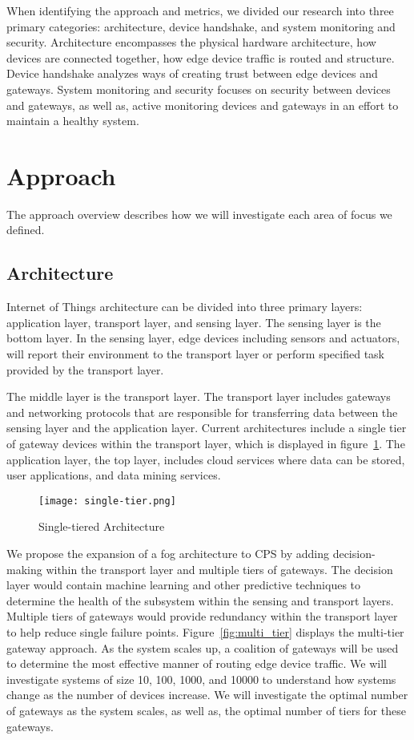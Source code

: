 \documentclass[../main.tex]{subfiles}
\begin{document}
When identifying the approach and metrics, we divided our research into three primary categories: architecture, device handshake, and system monitoring and security. Architecture encompasses the physical hardware architecture, how devices are connected together, how edge device traffic is routed and structure. Device handshake analyzes ways of creating trust between edge devices and gateways. System monitoring and security focuses on security between devices and gateways, as well as, active monitoring devices and gateways in an effort to maintain a healthy system. 


\section{Approach}

The approach overview describes how we will investigate each area of focus we defined. 

\subsection{Architecture}
Internet of Things architecture can be divided into three primary layers: application layer, transport layer, and sensing layer. The sensing layer is the bottom layer. In the sensing layer, edge devices including sensors and actuators, will report their environment to the transport layer or perform specified task provided by the transport layer. 

The middle layer is the transport layer. The transport layer includes gateways and networking protocols that are responsible for transferring data between the sensing layer and the application layer. Current architectures include a single tier of gateway devices within the transport layer, which is displayed in figure~\ref{fig:sing_tier}. 
The application layer, the top layer, includes cloud services where data can be stored, user applications, and data mining services. 

\begin{figure}[!htb]
    \centering
    \texttt{[image: single-tier.png]}
    \caption{Single-tiered Architecture}
    \label{fig:sing_tier}
\end{figure}

We propose the expansion of a fog architecture to CPS by adding decision-making within the transport layer and multiple tiers of gateways. The decision layer would contain machine learning and other predictive techniques to determine the health of the subsystem within the sensing and transport layers. Multiple tiers of gateways would provide redundancy within the transport layer to help reduce single failure points. Figure~\ref{fig:multi_tier} displays the multi-tier gateway approach. As the system scales up, a coalition of gateways will be used to determine the most effective manner of routing edge device traffic. We will investigate systems of size 10, 100, 1000, and 10000 to understand how systems change as the number of devices increase. We will investigate the optimal number of gateways as the system scales, as well as, the optimal number of tiers for these gateways. 
\end{document}
